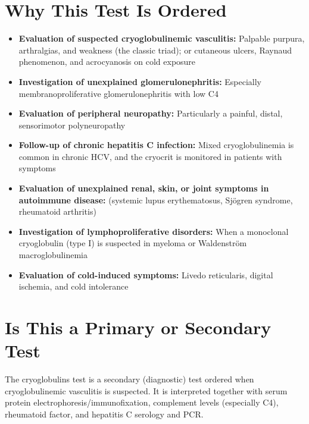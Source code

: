 \section*{Why This Test Is Ordered}
\begin{itemize}
  \item \textbf{Evaluation of suspected cryoglobulinemic vasculitis:} Palpable purpura, arthralgias, and weakness (the classic triad); or cutaneous ulcers, Raynaud phenomenon, and acrocyanosis on cold exposure
  \item \textbf{Investigation of unexplained glomerulonephritis:} Especially membranoproliferative glomerulonephritis with low C4
  \item \textbf{Evaluation of peripheral neuropathy:} Particularly a painful, distal, sensorimotor polyneuropathy
  \item \textbf{Follow-up of chronic hepatitis C infection:} Mixed cryoglobulinemia is common in chronic HCV, and the cryocrit is monitored in patients with symptoms
  \item \textbf{Evaluation of unexplained renal, skin, or joint symptoms in autoimmune disease:} (systemic lupus erythematosus, Sj\"ogren syndrome, rheumatoid arthritis)
  \item \textbf{Investigation of lymphoproliferative disorders:} When a monoclonal cryoglobulin (type I) is suspected in myeloma or Waldenstr\"om macroglobulinemia
  \item \textbf{Evaluation of cold-induced symptoms:} Livedo reticularis, digital ischemia, and cold intolerance
\end{itemize}

\section*{Is This a Primary or Secondary Test}
The cryoglobulins test is a secondary (diagnostic) test ordered when cryoglobulinemic vasculitis is suspected. It is interpreted together with serum protein electrophoresis/immunofixation, complement levels (especially C4), rheumatoid factor, and hepatitis C serology and PCR.

